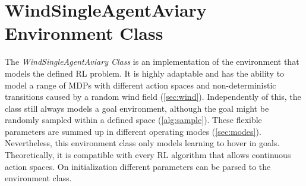 \section{WindSingleAgentAviary Environment Class} \label{sec:env}
The \emph{WindSingleAgentAviary Class} is an implementation of the environment that models the defined RL problem. 
It is highly adaptable and has the ability to model a range of MDPs with different action spaces and 
non-deterministic transitions caused by a random wind field (\cref{sec:wind}). 
Independently of this, the class still always models a goal environment, 
although the goal might be randomly sampled within a defined space (\cref{alg:sample}). 
These flexible parameters are summed up in different operating modes (\cref{sec:modes}). 
Nevertheless, this environment class only models learning to hover in goals. 
Theoretically, it is compatible with every RL algorithm that allows continuous action spaces.
On initialization different parameters can be parsed to the environment class.

